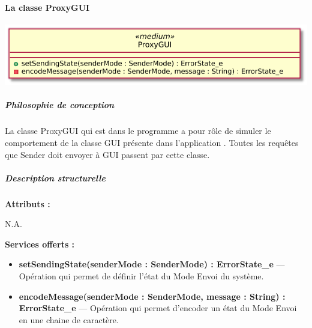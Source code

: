\paragraph{La classe ProxyGUI}

\begin{minipage}
    {\linewidth}
    \centering
    \includegraphics[width=0.65\linewidth]{../schemas/Conception_detaillee/classe_proxyGUI.pdf}
\end{minipage}

\subparagraph{Philosophie de conception \newline} 

\medspace

La classe ProxyGUI qui est dans le programme {\nomLogiciel} a pour rôle de simuler le comportement de la classe GUI présente dans l'application {\nomApplication}. Toutes les requêtes que Sender doit envoyer à GUI passent par cette classe.

\subparagraph{Description structurelle \newline}

\medspace

\textbf{Attributs :}

N.A.

\textbf{Services offerts :}

\begin{itemize}
    \item \textbf{setSendingState(senderMode : SenderMode) : ErrorState\_e} --- Opération qui permet de définir l'état du Mode Envoi du système.
    \item \textbf{encodeMessage(senderMode : SenderMode, message : String) : ErrorState\_e} --- Opération qui permet d'encoder un état du Mode Envoi en une chaine de caractère.
\end{itemize}
